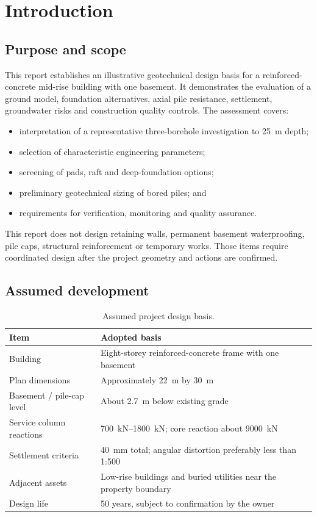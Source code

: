 \section{Introduction}
\subsection{Purpose and scope}
This report establishes an illustrative geotechnical design basis for a reinforced-concrete
mid-rise building with one basement. It demonstrates the evaluation of a ground model,
foundation alternatives, axial pile resistance, settlement, groundwater risks and construction
quality controls. The assessment covers:
\begin{itemize}
  \item interpretation of a representative three-borehole investigation to
        \SI{25}{\metre} depth;
  \item selection of characteristic engineering parameters;
  \item screening of pads, raft and deep-foundation options;
  \item preliminary geotechnical sizing of bored piles; and
  \item requirements for verification, monitoring and quality assurance.
\end{itemize}

This report does not design retaining walls, permanent basement waterproofing, pile caps,
structural reinforcement or temporary works. Those items require coordinated design after the
project geometry and actions are confirmed.

\subsection{Assumed development}
\begin{table}[H]
\centering
\caption{Assumed project design basis.}
\label{tab:project-basis}
\begin{tabularx}{\textwidth}{@{}L{47mm}Y@{}}
\toprule
{}
\textbf{Item} & \textbf{Adopted basis} \\
\midrule
Building & Eight-storey reinforced-concrete frame with one basement \\
Plan dimensions & Approximately \SI{22}{\metre} by \SI{30}{\metre} \\
Basement / pile-cap level & About \SI{2.7}{\metre} below existing grade \\
Service column reactions & \SIrange{700}{1800}{\kilo\newton}; core reaction about \SI{9000}{\kilo\newton} \\
Settlement criteria & \SI{40}{\milli\metre} total; angular distortion preferably less than 1:500 \\
Adjacent assets & Low-rise buildings and buried utilities near the property boundary \\
Design life & 50 years, subject to confirmation by the owner \\
\bottomrule
\end{tabularx}
\end{table}

